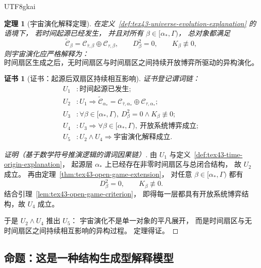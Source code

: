 \documentclass[12pt]{article}
\newtheorem{theorem}{定理}[section]
\newtheorem{Certificate}{证书}[section]
\begin{document}
\begin{CJK*}{UTF8}{gkai}
\begin{theorem}[宇宙演化解释定理]
\label{thm:tex43-universe-evolution-explanation}
在定义~\ref{def:tex43-universe-evolution-explanation} 的语境下，
若时间起源已经发生，
并且对所有 $\beta\in[\alpha_\ast,\Gamma)$，
总对象都满足
\[
  \widetilde{\mathcal C}_\beta
  =
  \mathcal C_{\bar\tau,\beta}\oplus \mathcal C_{\tau,\beta},
  \qquad
  D_\beta^2=0,
  \qquad
  K_\beta\not\equiv 0,
\]
则宇宙演化应严格解释为：
\[
  \boxed{
    \text{时间扇区生成之后，无时间扇区与时间扇区之间持续开放博弈所驱动的异构演化。}
  }
\]
\end{theorem}

\begin{Certificate}[证书：起源后双扇区持续相互影响]
\label{cert:tex43-universe-evolution-explanation}
证书登记谓词链：
\[
\begin{aligned}
  U_1 &: \text{时间起源已发生};\\
  U_2 &: U_1 \Rightarrow
         \widetilde{\mathcal C}_{\alpha_\ast}
         =
         \mathcal C_{\bar\tau,\alpha_\ast}\oplus \mathcal C_{\tau,\alpha_\ast};\\
  U_3 &: \forall \beta\in[\alpha_\ast,\Gamma),\
         D_\beta^2=0\wedge K_\beta\not\equiv 0;\\
  U_4 &: U_3 \Rightarrow
         \forall \beta\in[\alpha_\ast,\Gamma),\ \text{开放系统博弈成立};\\
  U_5 &: U_2\wedge U_4
         \Rightarrow
         \text{宇宙演化解释成立}.
\end{aligned}
\]
\end{Certificate}

\begin{proof}[证明（基于数学符号推演逻辑的谓词因果链）]
由 $U_1$ 与定义~\ref{def:tex43-time-origin-explanation}，
起源层 $\alpha_\ast$ 上已经存在非零时间扇区与总闭合结构，
故 $U_2$ 成立。
再由定理~\ref{thm:tex43-open-game-extension}，
对任意 $\beta\in[\alpha_\ast,\Gamma)$ 都有
\[
  D_\beta^2=0,
  \qquad
  K_\beta\not\equiv 0.
\]
结合引理~\ref{lem:tex43-open-game-criterion}，
即得每一层都具有开放系统博弈结构，故 $U_4$ 成立。

于是 $U_2\wedge U_4$ 推出 $U_5$：
宇宙演化不是单一对象的平凡展开，
而是时间扇区与无时间扇区之间持续相互影响的异构过程。
定理得证。
\end{proof}

\subsection{命题：这是一种结构生成型解释模型}
\label{subsec:tex43-ch10-proposition}


\end{CJK*}
\end{document}
